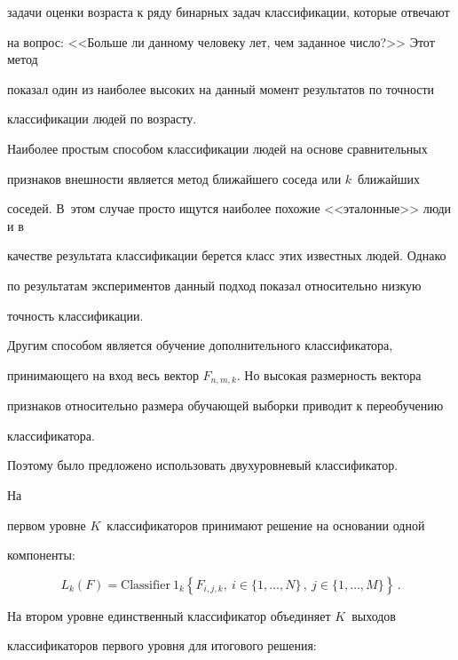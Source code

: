 задачи оценки возраста к ряду бинарных задач классификации, которые отвечают 


на вопрос: <<Больше ли данному человеку лет, чем заданное число?>> Этот метод 


показал один из наиболее высоких на данный момент результатов по точности 


классификации людей по возрасту. 





Наиболее простым способом классификации людей на основе сравнительных 


признаков внешности является метод ближайшего соседа или $k$~ближайших 


соседей. В~этом случае просто ищутся наиболее похожие <<эталонные>> люди и в 


качестве результата классификации берется класс этих известных людей. Однако 


по результатам экспериментов данный подход показал относительно низкую 


точность классификации. 





Другим способом является обучение дополнительного классификатора, 


принимающего на вход весь вектор $F_{n,m,k}$. Но высокая размерность вектора 


признаков относительно размера обучающей выборки приводит к переобучению 


классификатора. 


%


Поэтому было предложено использовать двухуровневый классификатор. 





На 


первом уровне $K$~классификаторов принимают решение на основании одной 


компоненты:


$$


L_k(F) =\mathrm{Classifier}~1_k\left\{F_{i,j,k},\ i\in \{1, \ldots , N\}\,,\ j\in \{1,\ldots , 


M\}\right\}\,.


$$


На втором уровне единственный классификатор объединяет $K$~выходов 


классификаторов первого уровня для итогового решения:


$$



